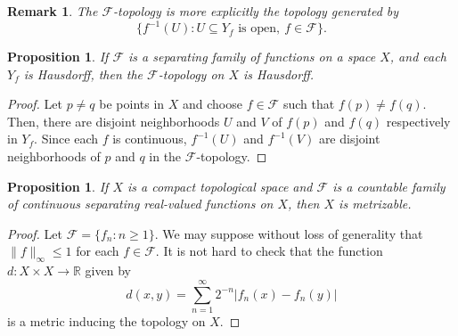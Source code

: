 \documentclass[11pt]{article}
\theoremstyle{thmstyle}
\newtheorem{proposition}[theorem]{Proposition}
\theoremstyle{defstyle}
\newtheorem{remark}[theorem]{Remark}
\newcommand{\R}{\mathbb{R}}
\newcommand{\scrF}{\mathscr F}
\renewcommand{\le}{\leqslant}
\renewcommand{\ge}{\geqslant}
\begin{document}
\begin{remark}
    The $\scrF$-topology is more explicitly the topology generated by 
    \begin{equation*}
        \{f^{-1}(U)\colon U\subseteq Y_f\text{ is open},~f\in\scrF\}.
    \end{equation*}
\end{remark}

\begin{proposition}
    If $\scrF$ is a separating family of functions on a space $X$, and each $Y_f$ is Hausdorff, then the $\scrF$-topology on $X$ is Hausdorff.
\end{proposition}
\begin{proof}
    Let $p\ne q$ be points in $X$ and choose $f\in\scrF$ such that $f(p)\ne f(q)$. Then, there are disjoint neighborhoods $U$ and $V$ of $f(p)$ and $f(q)$ respectively in $Y_f$. Since each $f$ is continuous, $f^{-1}(U)$ and $f^{-1}(V)$ are disjoint neighborhoods of $p$ and $q$ in the $\scrF$-topology.
\end{proof}

\begin{proposition}
    If $X$ is a compact topological space and $\scrF$ is a countable family of continuous separating real-valued functions on $X$, then $X$ is metrizable.
\end{proposition}
\begin{proof}
    Let $\scrF = \{f_n\colon n\ge 1\}$. We may suppose without loss of generality that $\|f\|_\infty\le 1$ for each $f\in\scrF$. It is not hard to check that the function $d: X\times X\to\R$ given by 
    \begin{equation*}
        d(x, y) = \sum_{n = 1}^\infty 2^{-n}|f_n(x) - f_n(y)|
    \end{equation*}
    is a metric inducing the topology on $X$.
\end{proof}
\end{document}
